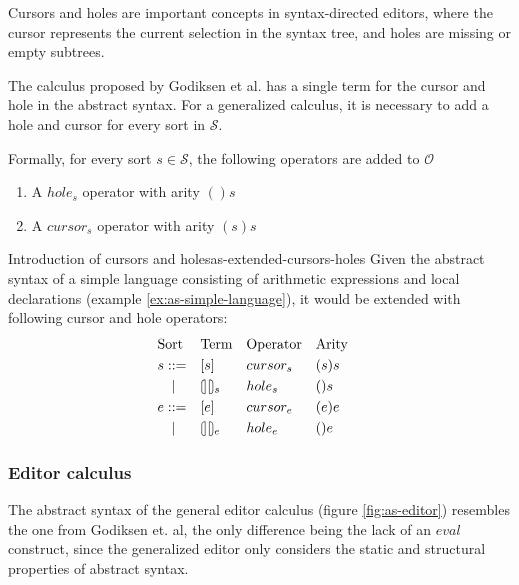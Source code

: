 Cursors and holes are important concepts in syntax-directed editors, where the cursor represents the current selection in the syntax tree, and holes are missing or empty subtrees.

The calculus proposed by Godiksen et al.\cite{godiksen} has a single term for the cursor and hole in the abstract syntax. For a generalized calculus, it is necessary to add a hole and cursor for every sort in $\mathcal{S}$.

Formally, for every sort $s \in \mathcal{S}$, the following operators are added to $\mathcal{O}$

\begin{enumerate}
    \item A $hole_s$ operator with arity $()s$
    \item A $cursor_s$ operator with arity $(s)s$
\end{enumerate}

\begin{example}{Introduction of cursors and holes}{as-extended-cursors-holes}
    Given the abstract syntax of a simple language consisting of arithmetic expressions and local declarations (example \ref{ex:as-simple-language}), it would be extended with following cursor and hole operators:
    \[
        \begin{aligned}
             & \text{Sort} &  & \text{Term} &  & \text{Operator} &  & \text{Arity} &  & \\
             & s ::=       &  & [s]         &  & cursor_s        &  & (s)s         &  & \\
             & \quad |     &  & \hole_s     &  & hole_s          &  & ()s          &  & \\
             & e ::=       &  & [e]         &  & cursor_e        &  & (e)e         &  & \\
             & \quad |     &  & \hole_e     &  & hole_e          &  & ()e
        \end{aligned}
    \]
\end{example}

\subsubsection{Editor calculus}
The abstract syntax of the general editor calculus (figure \ref{fig:as-editor}) resembles the one from Godiksen et. al, the only difference being the lack of an $eval$ construct, since the generalized editor only considers the static and structural properties of abstract syntax.

